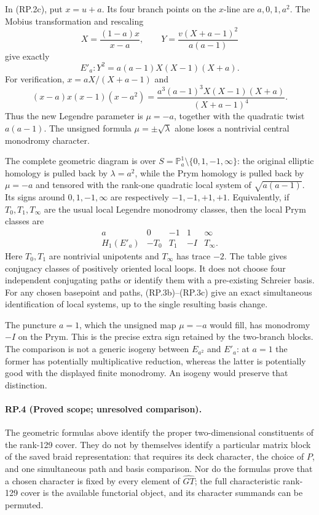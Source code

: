 In (RP.2c), put $x=u+a$. Its four branch points on
the $x$-line are $a,0,1,a^2$. The Mobius transformation
and rescaling
\[
       X=\frac{(1-a)x}{x-a},\qquad
       Y=\frac{v(X+a-1)^2}{a(a-1)}
 \tag{RP.3b}
\]
give exactly
\[
       \boxed{\ E'_a:Y^2=a(a-1)X(X-1)(X+a).\ }
 \tag{RP.3c}
\]
For verification, $x=aX/(X+a-1)$ and
\[
 (x-a)x(x-1)(x-a^2)
 =\frac{a^3(a-1)^3 X(X-1)(X+a)}{(X+a-1)^4}.
\]
Thus the new Legendre parameter is $\mu=-a$, together
with the quadratic twist $a(a-1)$. The unsigned formula
$\mu=\pm\sqrt\lambda$ alone loses a nontrivial central
monodromy character.

The complete geometric diagram is over
$S=\mathbb P^1_a\setminus\{0,1,-1,\infty\}$:
the original elliptic homology is pulled back by
$\lambda=a^2$, while the Prym homology is pulled back
by $\mu=-a$ and tensored with the rank-one quadratic
local system of $\sqrt{a(a-1)}$. Its signs around
$0,1,-1,\infty$ are respectively $-1,-1,+1,+1$.
Equivalently, if $T_0,T_1,T_\infty$ are the usual
local Legendre monodromy classes, then the local
Prym classes are
\[
\begin{array}{c|cccc}
 a&0&-1&1&\infty\\ \hline
 H_1(E'_a)&-T_0&T_1&-I&T_\infty.
\end{array}
 \tag{RP.3d}
\]
Here $T_0,T_1$ are nontrivial unipotents and
$T_\infty$ has trace $-2$. The table gives conjugacy
classes of positively oriented local loops. It does
not choose four independent conjugating paths or
identify them with a pre-existing Schreier basis.
For any chosen basepoint and paths, (RP.3b)--(RP.3c)
give an exact simultaneous identification of local
systems, up to the single resulting basis change.

The puncture $a=1$, which the unsigned map $\mu=-a$
would fill, has monodromy $-I$ on the Prym. This is
the precise extra sign retained by the two-branch
blocks. The comparison is not a generic isogeny
between $E_{a^2}$ and $E'_{a}$: at $a=1$ the former
has potentially multiplicative reduction, whereas
the latter is potentially good with the displayed
finite monodromy. An isogeny would preserve that
distinction.

\paragraph{RP.4 (Proved scope; unresolved comparison).}
The geometric formulas above identify the proper
two-dimensional constituents of the rank-129 cover.
They do not by themselves identify a particular
matrix block of the saved braid representation:
that requires its deck character, the choice of
$P$, and one simultaneous path and basis comparison.
Nor do the formulas prove that a chosen character
is fixed by every element of $\widehat{GT}$; the
full characteristic rank-129 cover is the available
functorial object, and its character summands can
be permuted.

